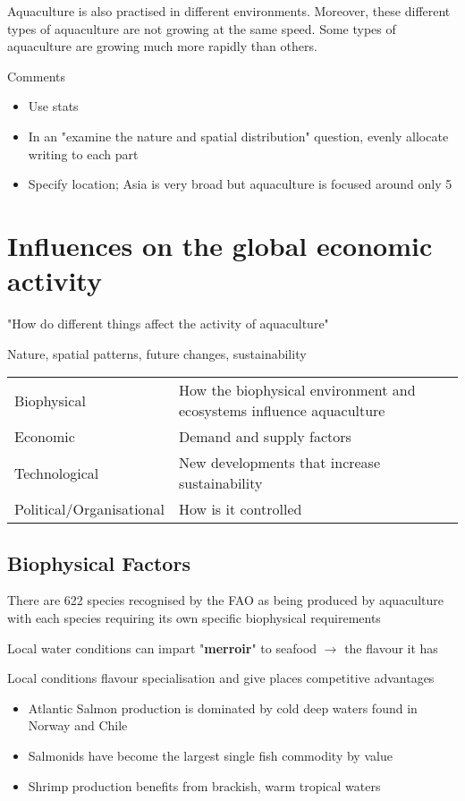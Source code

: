 Aquaculture is also practised in different environments. Moreover, these different types of aquaculture are not growing at the same speed. Some types of aquaculture are growing much more rapidly than others. 

{\large Comments}
\begin{itemize}
	\item Use stats
	\item In an "examine the nature and spatial distribution" question, evenly allocate writing to each part
	\item Specify location; Asia is very broad but aquaculture is focused around only 5
\end{itemize}

\section{Influences on the global economic activity} \label{8/11/2024}
	"How do different things affect the activity of aquaculture"

	Nature, spatial patterns, future changes, sustainability

	\begin{table}[htbp]
		\centering
		\begin{tabular}{ll}
			Biophysical & How the biophysical environment and ecosystems influence aquaculture \\
			Economic & Demand and supply factors \\
			Technological & New developments that increase sustainability \\
			Political/Organisational & How is it controlled \\
		\end{tabular}
	\end{table}

	\subsection{Biophysical Factors}
		There are 622 species recognised by the FAO as being produced by aquaculture with each species requiring its own specific biophysical requirements

		Local water conditions can impart "\textbf{merroir}" to seafood $\rightarrow$ the flavour it has

		Local conditions flavour specialisation and give places competitive advantages
		\begin{itemize}
			\item Atlantic Salmon production is dominated by cold deep waters found in Norway and Chile
			\item Salmonids have become the largest single fish commodity by value
			\item Shrimp production benefits from brackish, warm tropical waters
		\end{itemize}

